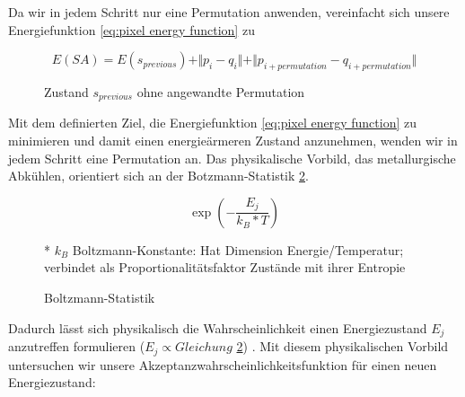 Da wir in jedem Schritt nur eine Permutation anwenden, vereinfacht sich unsere Energiefunktion
\ref{eq:pixel energy function} zu 

\begin{figure}[H]
    \begin{tcolorbox}[rightrule=3mm, rounded corners=east]
    \[ E(SA) = E(s_{previous}) + \Vert{p_{i}-q_{i}}\Vert + \Vert{p_{i 
        + permutation}-q_{i + permutation}}\Vert\]
    \end{tcolorbox}
  \caption{Zustand $s_{previous}$ ohne angewandte Permutation}
  \label{eq:vereinfachte pixel energy function}
\end{figure}

Mit dem definierten Ziel, die Energiefunktion \ref{eq:pixel energy function} zu minimieren und damit einen energieärmeren Zustand anzunehmen,
wenden wir in jedem Schritt eine Permutation an. Das physikalische Vorbild, das metallurgische Abkühlen, orientiert sich an 
der Botzmann-Statistik \ref{eq:Boltzmann-Statistik}.

\begin{figure}[H]
    \begin{tcolorbox}[rightrule=3mm, rounded corners=east]
    \[ \exp(-\frac{E_{j}}{k_{B}*T}) \]
    \end{tcolorbox}
    \caption{Boltzmann-Statistik}
    \label{eq:Boltzmann-Statistik}
    \medskip
    \small
    * $k_{B}$ Boltzmann-Konstante: Hat Dimension Energie/Temperatur; verbindet als Proportionalitätsfaktor
    Zustände mit ihrer Entropie
\end{figure}

Dadurch lässt sich physikalisch die Wahrscheinlichkeit einen Energiezustand $E_{j}$ anzutreffen formulieren 
($E_{j}\propto Gleichung$ \ref{eq:Boltzmann-Statistik}) \cite{Kirkpatrick671}. Mit diesem physikalischen Vorbild untersuchen 
wir unsere Akzeptanzwahrscheinlichkeitsfunktion für einen neuen Energiezustand: 

